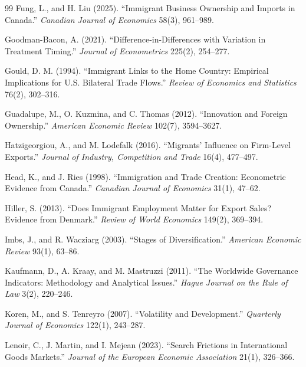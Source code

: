 \documentclass[12pt]{article}
\theoremstyle{remark}
\begin{document}
\begin{thebibliography}{99}
Fung, L., and H. Liu (2025). ``Immigrant Business Ownership and Imports in Canada.'' \textit{Canadian Journal of Economics} 58(3), 961--989.

Goodman-Bacon, A. (2021). ``Difference-in-Differences with Variation in Treatment Timing.'' \textit{Journal of Econometrics} 225(2), 254--277.

Gould, D. M. (1994). ``Immigrant Links to the Home Country: Empirical Implications for U.S. Bilateral Trade Flows.'' \textit{Review of Economics and Statistics} 76(2), 302--316.

Guadalupe, M., O. Kuzmina, and C. Thomas (2012). ``Innovation and Foreign Ownership.'' \textit{American Economic Review} 102(7), 3594--3627.

Hatzigeorgiou, A., and M. Lodefalk (2016). ``Migrants' Influence on Firm-Level Exports.'' \textit{Journal of Industry, Competition and Trade} 16(4), 477--497.

Head, K., and J. Ries (1998). ``Immigration and Trade Creation: Econometric Evidence from Canada.'' \textit{Canadian Journal of Economics} 31(1), 47--62.

Hiller, S. (2013). ``Does Immigrant Employment Matter for Export Sales? Evidence from Denmark.'' \textit{Review of World Economics} 149(2), 369--394.

Imbs, J., and R. Wacziarg (2003). ``Stages of Diversification.'' \textit{American Economic Review} 93(1), 63--86.

Kaufmann, D., A. Kraay, and M. Mastruzzi (2011). ``The Worldwide Governance Indicators: Methodology and Analytical Issues.'' \textit{Hague Journal on the Rule of Law} 3(2), 220--246.

Koren, M., and S. Tenreyro (2007). ``Volatility and Development.'' \textit{Quarterly Journal of Economics} 122(1), 243--287.

Lenoir, C., J. Martin, and I. Mejean (2023). ``Search Frictions in International Goods Markets.'' \textit{Journal of the European Economic Association} 21(1), 326--366.


\end{thebibliography}
\end{document}

